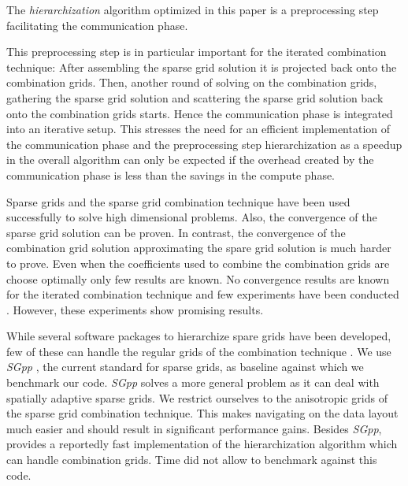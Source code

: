 \documentclass[letterpaper]{article}
\newcommand{\mypar}[1]{{\bf #1.}}
\begin{document}
			The \emph{hierarchization} algorithm optimized in this paper is a preprocessing step facilitating the communication phase. 

			This preprocessing step is in particular important for the iterated combination technique: After assembling the sparse grid solution it is projected back onto the combination grids. Then, another round of solving on the combination grids, gathering the sparse grid solution and scattering the sparse grid solution back onto the combination grids starts. Hence the communication phase is integrated into an iterative setup. This stresses the need for an efficient implementation of the communication phase and the preprocessing step hierarchization as a speedup in the overall algorithm can only be expected if the overhead created by the communication phase is less than the savings in the compute phase.






\noindent		\mypar{Related Work}
			Sparse grids \cite{smolyak63quadrature, zenger91sparse, bungartz04sparseGrids} and the sparse grid combination technique \cite{griebel92CombiTechnique} have been used successfully to solve high dimensional problems. Also, the convergence of the sparse grid solution can be proven. In contrast, the convergence of the combination grid solution approximating the spare grid solution is much harder to prove. Even when the coefficients used to combine the combination grids are choose optimally \cite{hegland07optiCom} only few results are known.
			No convergence results are known for the iterated combination technique and few experiments have been conducted \cite{griebel96numericalTurbulence}. However, these experiments show promising results. 

			While several software packages to hierarchize spare grids have been developed, few of these can handle the regular grids of the combination technique \cite{pflueger10spatially,buse12non-static}. We use \emph{SGpp} \cite{pflueger10spatially}, the current standard for sparse grids, as baseline against which we benchmark our code. \emph{SGpp} solves a more general problem as it can deal with spatially adaptive sparse grids. We restrict ourselves to the anisotropic grids of the sparse grid combination technique. This makes navigating on the data layout much easier and should result in significant performance gains. Besides \emph{SGpp}, \cite{buse12non-static} provides a reportedly fast implementation of the hierarchization algorithm which can handle combination grids. Time did not allow to benchmark against this code.
\end{document}
